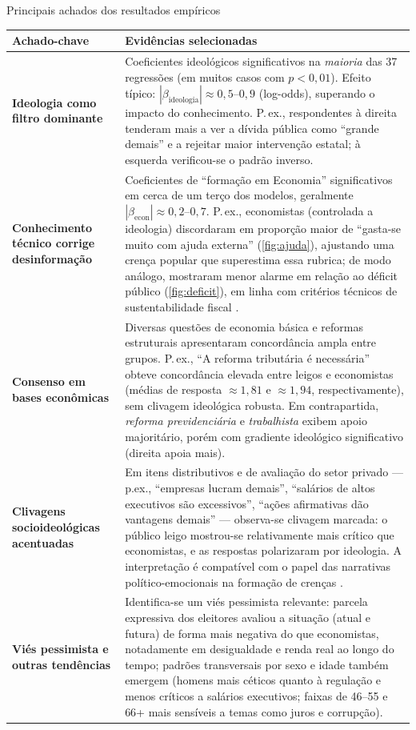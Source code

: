 \begin{quadro}[!htb]\centering\footnotesize
\caption{Principais achados dos resultados empíricos}\label{tab:achados}
\begin{tabular}{p{5.5cm} p{9.5cm}}
\toprule
\textbf{Achado-chave} & \textbf{Evidências selecionadas} \\
\midrule
\textbf{Ideologia como filtro dominante} & Coeficientes ideológicos significativos na \textit{maioria} das 37 regressões (em muitos casos com \(p<0{,}01\)). Efeito típico: \(|\beta_{\text{ideologia}}|\approx0{,}5\text{–}0{,}9\) (log-odds), superando o impacto do conhecimento. P.\,ex., respondentes à direita tenderam mais a ver a dívida pública como “grande demais” e a rejeitar maior intervenção estatal; à esquerda verificou-se o padrão inverso. \\
\textbf{Conhecimento técnico corrige desinformação} & Coeficientes de “formação em Economia” significativos em cerca de um terço dos modelos, geralmente \(|\beta_{\text{econ}}|\approx0{,}2\text{–}0{,}7\). P.\,ex., economistas (controlada a ideologia) discordaram em proporção maior de “gasta-se muito com ajuda externa” (\autoref{fig:ajuda}), ajustando uma crença popular que superestima essa rubrica; de modo análogo, mostraram menor alarme em relação ao déficit público (\autoref{fig:deficit}), em linha com critérios técnicos de sustentabilidade fiscal \cite{The_Myth_of_the_Rational_Voter}. \\
\textbf{Consenso em bases econômicas} & Diversas questões de economia básica e reformas estruturais apresentaram concordância ampla entre grupos. P.\,ex., “A reforma tributária é necessária” obteve concordância elevada entre leigos e economistas (médias de resposta \(\approx1{,}81\) e \(\approx1{,}94\), respectivamente), sem clivagem ideológica robusta. Em contrapartida, \textit{reforma previdenciária} e \textit{trabalhista} exibem apoio majoritário, porém com gradiente ideológico significativo (direita apoia mais). \\
\textbf{Clivagens socioideológicas acentuadas} & Em itens distributivos e de avaliação do setor privado — p.ex., “empresas lucram demais”, “salários de altos executivos são excessivos”, “ações afirmativas dão vantagens demais” — observa-se clivagem marcada: o público leigo mostrou-se relativamente mais crítico que economistas, e as respostas polarizaram por ideologia. A interpretação é compatível com o papel das narrativas político-emocionais na formação de crenças \cite{westen2007political}. \\
\textbf{Viés pessimista e outras tendências} & Identifica-se um viés pessimista relevante: parcela expressiva dos eleitores avaliou a situação (atual e futura) de forma mais negativa do que economistas, notadamente em desigualdade e renda real ao longo do tempo; padrões transversais por sexo e idade também emergem (homens mais céticos quanto à regulação e menos críticos a salários executivos; faixas de 46–55 e 66+ mais sensíveis a temas como juros e corrupção). \\
\bottomrule
\end{tabular}
\end{quadro}

